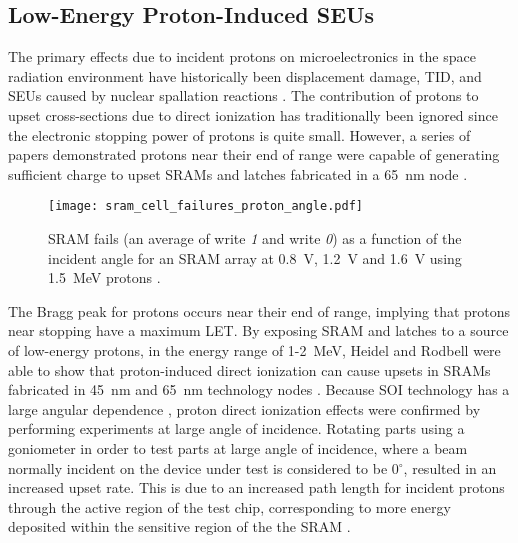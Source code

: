 \subsection{Low-Energy Proton-Induced SEUs} %
\label{sub:low_energy_proton_induced_seus}
The primary effects due to incident protons on microelectronics in the space radiation environment have historically been displacement damage, TID, and SEUs caused by nuclear spallation reactions \cite{reed1994implications,reed1997heavy,reed2002evidence,Reed:2007vz}.
The contribution of protons to upset cross-sections due to direct ionization has traditionally been ignored since the electronic stopping power of protons is quite small.
However, a series of papers demonstrated protons near their end of range were capable of generating sufficient charge to upset SRAMs and latches fabricated in a 65~nm node \cite{Heidel:2006tp,Heidel:2008vf,Heidel:2009vx,Rodbell:2007vl,Sierawski:2009ka}.

\begin{figure}[htbp]
    \begin{center}
        \texttt{[image: sram\_cell\_failures\_proton\_angle.pdf]}
    \end{center}
    \caption[SRAM fails (an average of write \emph{1} and write \emph{0}) as a function of the incident angle for an SRAM array at 0.8~V, 1.2~V and 1.6~V using 1.5~MeV protons.]{SRAM fails (an average of write \emph{1} and write \emph{0}) as a function of the incident angle for an SRAM array at 0.8~V, 1.2~V and 1.6~V using 1.5~MeV protons \cite{Rodbell:2007vl}.}
    \label{fig:sram_proton_angle_dep}
\end{figure}

The Bragg peak for protons occurs near their end of range, implying that protons near stopping have a maximum LET.
By exposing SRAM and latches to a source of low-energy protons, in the energy range of 1-2~MeV, Heidel and Rodbell were able to show that proton-induced direct ionization can cause upsets in SRAMs fabricated in 45~nm and 65~nm technology nodes \cite{Heidel:2006tp,Rodbell:2007vl,Heidel:2009vx}.
Because SOI technology has a large angular dependence \cite{Reed:2002wn}, proton direct ionization effects were confirmed by performing experiments at large angle of incidence.
Rotating parts using a goniometer in order to test parts at large angle of incidence, where a beam normally incident on the device under test is considered to be 0$^\circ$, resulted in an increased upset rate.
This is due to an increased path length for incident protons through the active region of the test chip, corresponding to more energy deposited within the sensitive region of the the SRAM \cite{Heidel:2006tp}.

